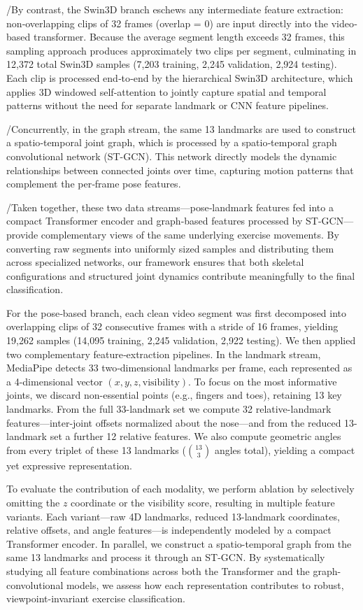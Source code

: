 \documentclass[journal,onecolumn, 11pt]{IEEEtran}
\begin{document}
/By contrast, the Swin3D branch eschews any intermediate feature extraction: non‐overlapping clips of 32 frames (overlap = 0) are input directly into the video‐based transformer. Because the average segment length exceeds 32 frames, this sampling approach produces approximately two clips per segment, culminating in 12,372 total Swin3D samples (7,203 training, 2,245 validation, 2,924 testing). Each clip is processed end‐to‐end by the hierarchical Swin3D architecture, which applies 3D windowed self‐attention to jointly capture spatial and temporal patterns without the need for separate landmark or CNN feature pipelines.

/Concurrently, in the graph stream, the same 13 landmarks are used to construct a spatio‐temporal joint graph, which is processed by a spatio‐temporal graph convolutional network (ST-GCN). This network directly models the dynamic relationships between connected joints over time, capturing motion patterns that complement the per‐frame pose features.

/Taken together, these two data streams—pose‐landmark features fed into a compact Transformer encoder and graph‐based features processed by ST-GCN—provide complementary views of the same underlying exercise movements. By converting raw segments into uniformly sized samples and distributing them across specialized networks, our framework ensures that both skeletal configurations and structured joint dynamics contribute meaningfully to the final classification.

For the pose‐based branch, each clean video segment was first decomposed into overlapping clips of 32 consecutive frames with a stride of 16 frames, yielding 19,262 samples (14,095 training, 2,245 validation, 2,922 testing). We then applied two complementary feature‐extraction pipelines. In the landmark stream, MediaPipe detects 33 two‐dimensional landmarks per frame, each represented as a 4-dimensional vector $(x, y, z, \text{visibility})$. To focus on the most informative joints, we discard non-essential points (e.g., fingers and toes), retaining 13 key landmarks. From the full 33-landmark set we compute 32 relative-landmark features—inter-joint offsets normalized about the nose—and from the reduced 13-landmark set a further 12 relative features. We also compute geometric angles from every triplet of these 13 landmarks ($\binom{13}{3}$ angles total), yielding a compact yet expressive representation.

To evaluate the contribution of each modality, we perform ablation by selectively omitting the $z$ coordinate or the visibility score, resulting in multiple feature variants. Each variant—raw 4D landmarks, reduced 13-landmark coordinates, relative offsets, and angle features—is independently modeled by a compact Transformer encoder. In parallel, we construct a spatio-temporal graph from the same 13 landmarks and process it through an ST-GCN. By systematically studying all feature combinations across both the Transformer and the graph-convolutional models, we assess how each representation contributes to robust, viewpoint-invariant exercise classification.
\end{document}
